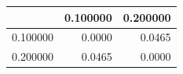 \begin{tabular}{lrr}
\toprule
 & 0.100000 & 0.200000 \\
\midrule
0.100000 & 0.0000 & 0.0465 \\
0.200000 & 0.0465 & 0.0000 \\
\bottomrule
\end{tabular}
